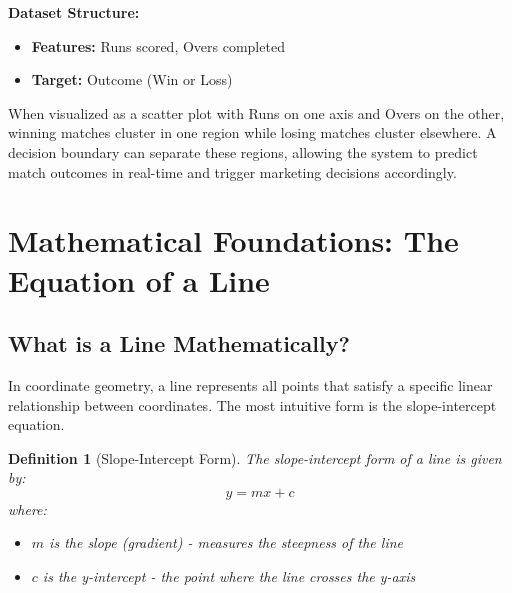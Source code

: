 \documentclass[12pt,a4paper]{article}
\theoremstyle{directpoint}
\newtheorem*{definition}{Definition}
\theoremstyle{definition}
\begin{document}
\textbf{Dataset Structure:}
\begin{itemize}
    \item \textbf{Features:} Runs scored, Overs completed
    \item \textbf{Target:} Outcome (Win or Loss)
\end{itemize}

When visualized as a scatter plot with Runs on one axis and Overs on the other, winning matches cluster in one region while losing matches cluster elsewhere. A decision boundary can separate these regions, allowing the system to predict match outcomes in real-time and trigger marketing decisions accordingly.

\newpage

\section{Mathematical Foundations: The Equation of a Line}

\subsection{What is a Line Mathematically?}

In coordinate geometry, a line represents all points that satisfy a specific linear relationship between coordinates. The most intuitive form is the slope-intercept equation.

\begin{definition}[Slope-Intercept Form]
The slope-intercept form of a line is given by:
\begin{equation}
y = mx + c
\end{equation}
where:
\begin{itemize}
    \item $m$ is the slope (gradient) - measures the steepness of the line
    \item $c$ is the y-intercept - the point where the line crosses the y-axis
\end{itemize}
\end{definition}
\end{document}
